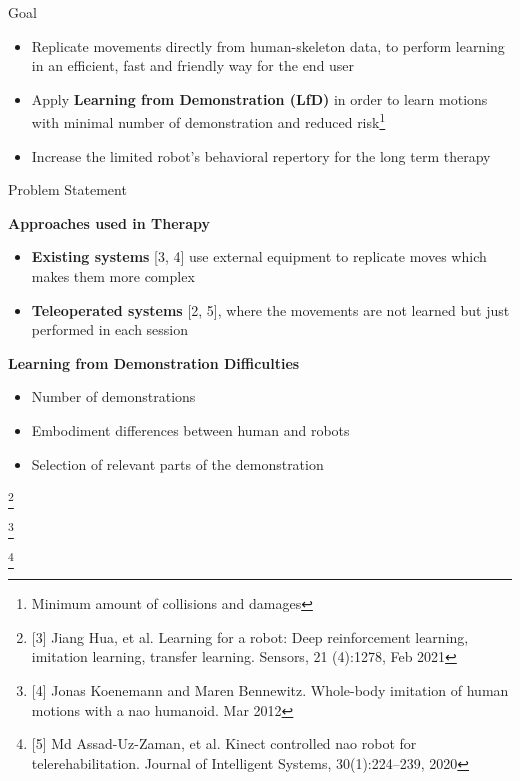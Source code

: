 \documentclass[aspectratio=169]{beamer}
\newcommand\blfootnote[1]{%
	\begingroup
	\renewcommand\thefootnote{}\footnote{#1}%
	\addtocounter{footnote}{-1}%
	\endgroup
}
\begin{document}
\begin{frame}{Goal}
	\begin{itemize}
		\item Replicate movements directly from human-skeleton data, to perform learning in an efficient, fast and friendly way for the end user
		\newline
		\item Apply \textcolor{hbrsblue}{\textbf{Learning from Demonstration (LfD)}} in order to learn motions with minimal number of demonstration and reduced risk\footnote{Minimum amount of collisions and damages}
		\newline
		\item Increase the limited robot's behavioral repertory for the long term therapy
		
	\end{itemize}
\end{frame}

\begin{frame}{Problem Statement}
\begin{minipage}{0.49\linewidth}
	\centering
	\textcolor{hbrsblue}{\textbf{Approaches used in Therapy}}
	\newline
	\begin{itemize}
		\item \textcolor{hbrsblue}{\textbf{Existing systems}} [3, 4] use external equipment to replicate moves which makes them more complex
		\newline
		\item \textcolor{hbrsblue}{\textbf{Teleoperated systems}} [2, 5], where the movements are not learned but just performed in each session
	\end{itemize}
\end{minipage}\hfill	
\begin{minipage}{0.49\linewidth}
	\centering
	\textcolor{hbrsblue}{\textbf{Learning from Demonstration Difficulties}}
	\begin{itemize}
		\item Number of demonstrations
		\newline
		\item Embodiment differences between human and robots
		\newline
		\item Selection of relevant parts of the demonstration
	\end{itemize}
\end{minipage}
\blfootnote{[3] Jiang Hua, et al. Learning for a robot: Deep reinforcement learning, imitation learning, transfer learning. Sensors, 21 (4):1278, Feb 2021}
\blfootnote{[4] Jonas Koenemann and Maren Bennewitz. Whole-body imitation of human motions with a nao humanoid. Mar 2012}
\blfootnote{[5] Md Assad-Uz-Zaman, et al. Kinect controlled nao robot for telerehabilitation. Journal of Intelligent Systems, 30(1):224–239, 2020}
\end{frame}	
\end{document}
